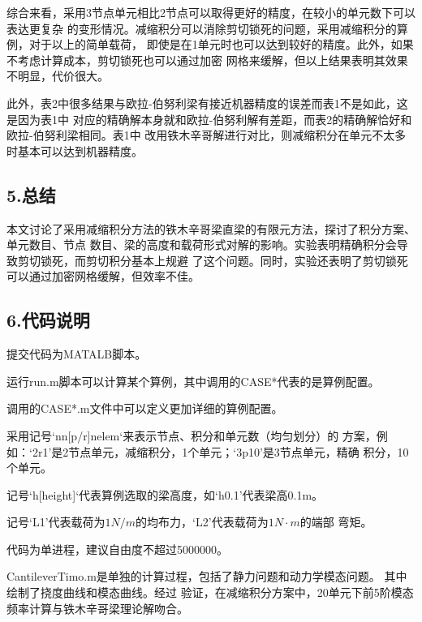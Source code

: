 \documentclass[UTF8,c5size]{ctexart}
\begin{document}
综合来看，采用3节点单元相比2节点可以取得更好的精度，在较小的单元数下可以表达更复杂
的变形情况。减缩积分可以消除剪切锁死的问题，采用减缩积分的算例，对于以上的简单载荷，
即使是在1单元时也可以达到较好的精度。此外，如果不考虑计算成本，剪切锁死也可以通过加密
网格来缓解，但以上结果表明其效果不明显，代价很大。

此外，表2中很多结果与欧拉-伯努利梁有接近机器精度的误差而表1不是如此，这是因为表1中
对应的精确解本身就和欧拉-伯努利解有差距，而表2的精确解恰好和欧拉-伯努利梁相同。表1中
改用铁木辛哥解进行对比，则减缩积分在单元不太多时基本可以达到机器精度。

\subsection*{5.总结}

本文讨论了采用减缩积分方法的铁木辛哥梁直梁的有限元方法，探讨了积分方案、单元数目、节点
数目、梁的高度和载荷形式对解的影响。实验表明精确积分会导致剪切锁死，而剪切积分基本上规避
了这个问题。同时，实验还表明了剪切锁死可以通过加密网格缓解，但效率不佳。

\subsection*{6.代码说明}

提交代码为MATALB脚本。

运行run.m脚本可以计算某个算例，其中调用的CASE*代表的是算例配置。

调用的CASE*.m文件中可以定义更加详细的算例配置。

采用记号‘nn[p/r]nelem‘来表示节点、积分和单元数（均匀划分）的
方案，例如：‘2r1’是2节点单元，减缩积分，1个单元；‘3p10’是3节点单元，精确
积分，10个单元。

记号‘h[height]‘代表算例选取的梁高度，如‘h0.1’代表梁高0.1m。

记号‘L1’代表载荷为$1N/m$的均布力，‘L2’代表载荷为$1N\cdot m$的端部
弯矩。

代码为单进程，建议自由度不超过5000000。

CantileverTimo.m是单独的计算过程，包括了静力问题和动力学模态问题。
其中绘制了挠度曲线和模态曲线。经过
验证，在减缩积分方案中，20单元下前5阶模态频率计算与铁木辛哥梁理论解吻合。


\end{document}
